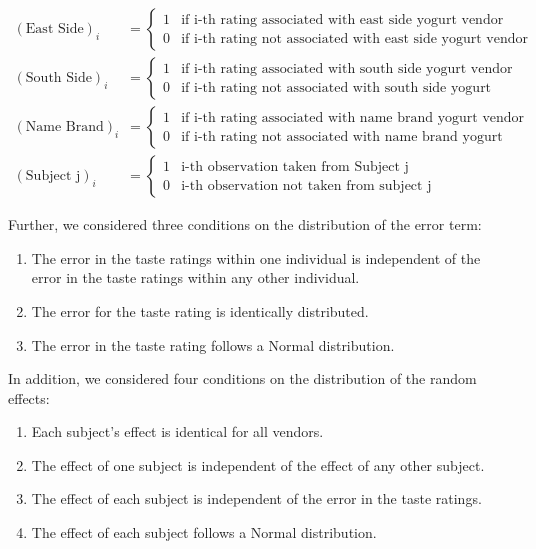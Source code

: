 \documentclass[
]{book}
\providecommand{\tightlist}{%
  \setlength{\itemsep}{0pt}\setlength{\parskip}{0pt}}
\theoremstyle{plain}
\theoremstyle{mydefn}
\theoremstyle{myexmpl}
\theoremstyle{remark}
\begin{document}
\[
\begin{aligned}
  (\text{East Side})_i &= \begin{cases}
    1 & \text{if i-th rating associated with east side yogurt vendor} \\
    0 & \text{if i-th rating not associated with east side yogurt vendor}
    \end{cases} \\
  (\text{South Side})_i &= \begin{cases}
    1 & \text{if i-th rating associated with south side yogurt vendor} \\
    0 & \text{if i-th rating not associated with south side yogurt vendor}
    \end{cases} \\
  (\text{Name Brand})_i &= \begin{cases}
    1 & \text{if i-th rating associated with name brand yogurt vendor} \\
    0 & \text{if i-th rating not associated with name brand yogurt vendor}
    \end{cases} \\
  (\text{Subject j})_i &= \begin{cases}
  1 & \text{i-th observation taken from Subject j} \\
  0 & \text{i-th observation not taken from subject j}
  \end{cases}
\end{aligned}
\]

Further, we considered three conditions on the distribution of the error term:

\begin{enumerate}
\def\labelenumi{\arabic{enumi}.}
\tightlist
\item
  The error in the taste ratings within one individual is independent of the error in the taste ratings within any other individual.
\item
  The error for the taste rating is identically distributed.
\item
  The error in the taste rating follows a Normal distribution.
\end{enumerate}

In addition, we considered four conditions on the distribution of the random effects:

\begin{enumerate}
\def\labelenumi{\arabic{enumi}.}
\tightlist
\item
  Each subject's effect is identical for all vendors.
\item
  The effect of one subject is independent of the effect of any other subject.
\item
  The effect of each subject is independent of the error in the taste ratings.
\item
  The effect of each subject follows a Normal distribution.
\end{enumerate}
\end{document}
